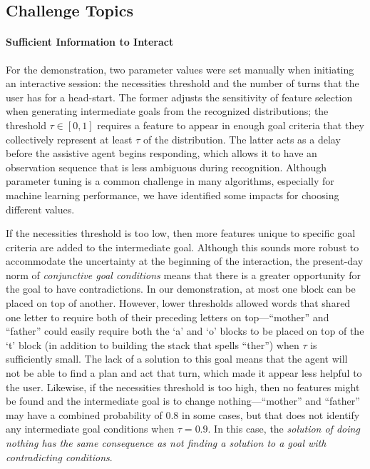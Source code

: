 \documentclass[letterpaper]{article} %
\begin{document}
\subsection{Challenge Topics\label{sec:challenges.topics}}
\paragraph{Sufficient Information to Interact} For the demonstration, two parameter values were set manually when initiating an interactive session: the necessities threshold and the number of turns that the user has for a head-start.  The former adjusts the sensitivity of feature selection when generating intermediate goals from the recognized distributions; the threshold $\tau \in [0, 1]$ requires a feature to appear in enough goal criteria that they collectively represent at least $\tau$ of the distribution.  The latter acts as a delay before the assistive agent begins responding, %
 which allows it to have an observation sequence that is less ambiguous during recognition.  Although parameter tuning is a common challenge in many algorithms, especially for machine learning performance, we have identified some impacts for choosing different values.

If the necessities threshold is too low, then more features unique to specific goal criteria are added to the intermediate goal.  Although this sounds more robust to accommodate the uncertainty at the beginning of the interaction, the present-day norm of \textit{conjunctive goal conditions} means that there is a greater opportunity for the goal to have contradictions.  In our demonstration, at most one block can be placed on top of another.  However, lower thresholds allowed words that shared one letter to require both of their preceding letters on top---``mother'' and ``father'' could easily require both the `a' and `o' blocks to be placed on top of the `t' block (in addition to building the stack that spells ``ther'') when $\tau$ is sufficiently small.
 The lack of a solution to this goal means that the agent will not be able to find a plan and act that turn, which made it appear less helpful to the user.  Likewise, if the necessities threshold is too high, then no features might be found and the intermediate goal is to change nothing---``mother'' and ``father'' may have a combined probability of $0.8$ in some cases, but that does not identify any intermediate goal conditions when $\tau = 0.9$.
 In this case, the \textit{solution of doing nothing has the same consequence as not finding a solution to a goal with contradicting conditions}.
\end{document}
